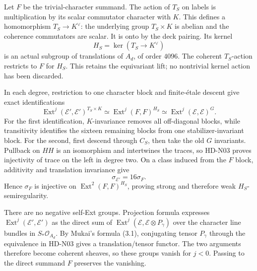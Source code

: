 Let $F$ be the trivial-character summand. The action of $T_S$ on labels
is multiplication by its scalar commutator character with $K$. This
defines a homomorphism $T_S\to K^\vee$: the underlying group
$T_S\times K$ is abelian and the coherence commutators are scalar.
It is onto by the deck pairing. Its kernel
\[
 H_S=\ker(T_S\to K^\vee)
\]
is an actual subgroup of translations of $A_d$, of order $4096$.
The coherent $T_S$-action restricts to $F$ for $H_S$. This retains the
equivariant lift; no nontrivial kernel action has been discarded.

In each degree, restriction to one character block and finite-\'etale
descent give exact identifications
\begin{equation}\label{hd-n-character-ext}
 \operatorname{Ext}^j(\mathcal E',\mathcal E')^{T_S\times K}
 \simeq\operatorname{Ext}^j(F,F)^{H_S}
 \simeq\operatorname{Ext}^j(\mathcal E,\mathcal E)^G.
\end{equation}
For the first identification, $K$-invariance removes all off-diagonal
blocks, while transitivity identifies the sixteen remaining blocks
from one stabilizer-invariant block. For the second, first descend
through $C_S$, then take the old $G$ invariants. Pullback on $HH$ is an
isomorphism and intertwines the traces, so HD-N03 proves injectivity
of trace on the left in degree two. On a class induced from the
$F$ block, additivity and translation invariance give
\[
 \sigma_{\mathcal E'}=16\sigma_F.
\]
Hence $\sigma_F$ is injective on
$\operatorname{Ext}^2(F,F)^{H_S}$, proving strong and therefore weak
$H_S$-semiregularity.

There are no negative self-Ext groups. Projection formula expresses
$\operatorname{Ext}^j(\mathcal E',\mathcal E')$ as the direct sum of
$\operatorname{Ext}^j(\mathcal E,\mathcal E\otimes P_\gamma)$ over
the character line bundles in $S_*\mathcal O_{A_d}$. By Mukai's formula
(3.1), conjugating tensor $P_\gamma$ through the equivalence in
HD-N03 gives a translation/tensor functor. The two arguments therefore
become coherent sheaves, so these groups vanish for $j<0$. Passing to
the direct summand $F$ preserves the vanishing.

